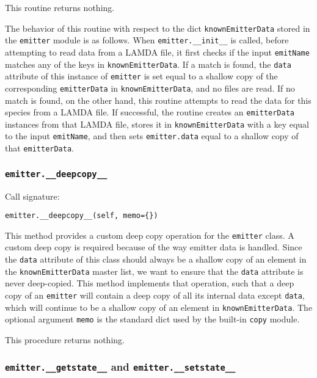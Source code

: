 \documentclass[12pt]{article}
\begin{document}
This routine returns nothing.

The behavior of this routine with respect to the dict \verb=knownEmitterData= stored in the \verb=emitter= module is as follows. When \verb=emitter.__init__= is called, before attempting to read data from a LAMDA file, it first checks if the input \verb=emitName= matches any of the keys in \verb=knownEmitterData=. If a match is found, the \verb=data= attribute of this instance of \verb=emitter= is set equal to a shallow copy of the corresponding \verb=emitterData= in \verb=knownEmitterData=, and no files are read. If no match is found, on the other hand, this routine attempts to read the data for this species from a LAMDA file. If successful, the routine creates an \verb=emitterData= instances from that LAMDA file, stores it in \verb=knownEmitterData= with a key equal to the input \verb=emitName=, and then sets \verb=emitter.data= equal to a shallow copy of that \verb=emitterData=.

\subsubsection{\texttt{emitter.\_\_deepcopy\_\_}}

Call signature:

\begin{verbatim}
emitter.__deepcopy__(self, memo={})
\end{verbatim}

This method provides a custom deep copy operation for the \verb=emitter= class. A custom deep copy is required because of the way emitter data is handled. Since the \verb=data= attribute of this class should always be a shallow copy of an element in the \verb=knownEmitterData= master list, we want to ensure that the \verb=data= attribute is never deep-copied. This method implements that operation, such that a deep copy of an \verb=emitter= will contain a deep copy of all its internal data except \verb=data=, which will continue to be a shallow copy of an element in \verb=knownEmitterData=. The optional argument \verb=memo= is the standard dict used by the built-in \verb=copy= module.

This procedure returns nothing.

\subsubsection{\texttt{emitter.\_\_getstate\_\_} and \texttt{emitter.\_\_setstate\_\_}}
\end{document}
